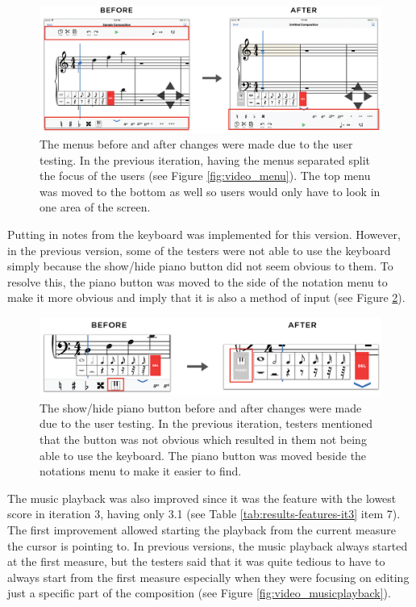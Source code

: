 				\begin{figure}[h]
					\centering
					\includegraphics[scale=0.28]{figures/before-after-menu}
				    \caption{The menus before and after changes were made due to the user testing. In the previous iteration, having the menus separated split the focus of the users (see Figure \ref{fig:video_menu}). The top menu was moved to the bottom as well so users would only have to look in one area of the screen.}
				    \label{fig:before-after-menu}
				\end{figure}

				Putting in notes from the keyboard was implemented for this version. However, in the previous version, some of the testers were not able to use the keyboard simply because the show/hide piano button did not seem obvious to them. To resolve this, the piano button was moved to the side of the notation menu to make it more obvious and imply that it is also a method of input (see Figure \ref{fig:before-after-pianobtn}). 

				\begin{figure}[h]
					\centering
					\includegraphics[scale=0.273]{figures/before-after-pianobtn.png}
				    \caption{The show/hide piano button before and after changes were made due to the user testing. In the previous iteration, testers mentioned that the button was not obvious which resulted in them not being able to use the keyboard. The piano button was moved beside the notations menu to make it easier to find.}
				    \label{fig:before-after-pianobtn}
				\end{figure}

				The music playback was also improved since it was the feature with the lowest score in iteration 3, having only 3.1 (see Table \ref{tab:results-features-it3} item 7). The first improvement allowed starting the playback from the current measure the cursor is pointing to. In previous versions, the music playback always started at the first measure, but the testers said that it was quite tedious to have to always start from the first measure especially when they were focusing on editing just a specific part of the composition (see Figure \ref{fig:video_musicplayback}). 

